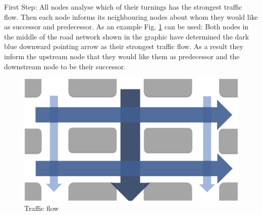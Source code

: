 First Step: All nodes analyse which of their turnings has the strongest traffic flow. Then each node informs its neighbouring nodes about whom they would like as successor and predecessor. As an example Fig. \ref{fig:flow} can be used: Both nodes in the middle of the road network shown in the graphic have determined the dark blue downward pointing arrow as their strongest traffic flow. As a result they inform the upstream node that they would like them as predecessor and the downstream node to be their successor.

\begin{figure} [!htb]
	\centering
	\includegraphics[scale=0.25]{pic/TrafficFlow.png}
	\caption{Traffic flow \cite{organicHPSS}}
	\label{fig:flow}
\end{figure}

